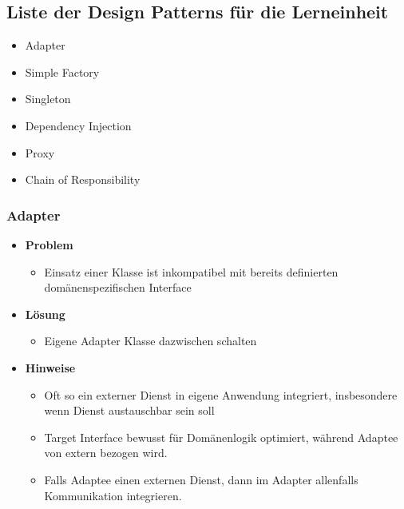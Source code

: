 \documentclass[../ZF_SWEN1.tex]{subfiles}
\begin{document}
\subsection{Liste der Design Patterns für die Lerneinheit}
\begin{itemize}
	\item Adapter
	\item Simple Factory 
	\item Singleton
	\item Dependency Injection
	\item Proxy 
	\item Chain of Responsibility
\end{itemize}

\subsubsection{Adapter}

\begin{itemize}
	\item \textbf{Problem}
	\begin{itemize}
		\item Einsatz einer Klasse ist inkompatibel mit bereits definierten domänenspezifischen Interface
	\end{itemize}
	\item \textbf{Lösung}
	\begin{itemize}
		\item Eigene Adapter Klasse dazwischen schalten
	\end{itemize}
	\item \textbf{Hinweise}
	\begin{itemize}
		\item Oft so ein externer Dienst in eigene Anwendung integriert, insbesondere wenn Dienst austauschbar sein soll
		\item Target Interface bewusst für Domänenlogik optimiert, während Adaptee von extern bezogen wird.
		\item Falls Adaptee einen externen Dienst, dann im Adapter allenfalls Kommunikation integrieren.
	\end{itemize}
\end{itemize}
\end{document}

